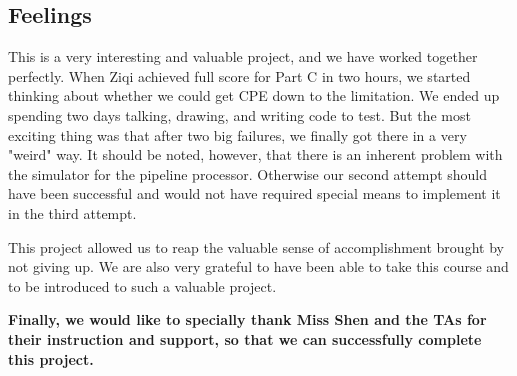 \documentclass[12pt,a4paper]{article}
\begin{document}
\subsection{Feelings}
This is a very interesting and valuable project, and we have worked together perfectly. 
When Ziqi achieved full score for Part C in two hours, we started thinking about whether we could get CPE down to the limitation.
We ended up spending two days talking, drawing, and writing code to test.
But the most exciting thing was that after two big failures, we finally got there in a very "weird" way.
It should be noted, however, that there is an inherent problem with the simulator for the pipeline processor. 
Otherwise our second attempt should have been successful and would not have required special means to implement it in the third attempt.

This project allowed us to reap the valuable sense of accomplishment brought by not giving up. We are also very grateful to have been able to take this course and to be introduced to such a valuable project.

\textbf{Finally, we would like to specially thank Miss Shen and the TAs for their instruction and support, so that we can successfully complete this project.}
\end{document}
